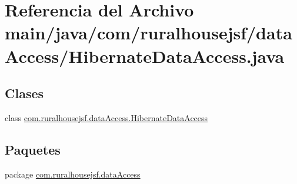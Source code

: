 \hypertarget{a00014}{}\section{Referencia del Archivo main/java/com/ruralhousejsf/data\+Access/\+Hibernate\+Data\+Access.java}
\label{a00014}
\subsection*{Clases}
\begin{DoxyCompactItemize}
\item 
class \mbox{\hyperlink{a00144}{com.\+ruralhousejsf.\+data\+Access.\+Hibernate\+Data\+Access}}
\end{DoxyCompactItemize}
\subsection*{Paquetes}
\begin{DoxyCompactItemize}
\item 
package \mbox{\hyperlink{a00112}{com.\+ruralhousejsf.\+data\+Access}}
\end{DoxyCompactItemize}
